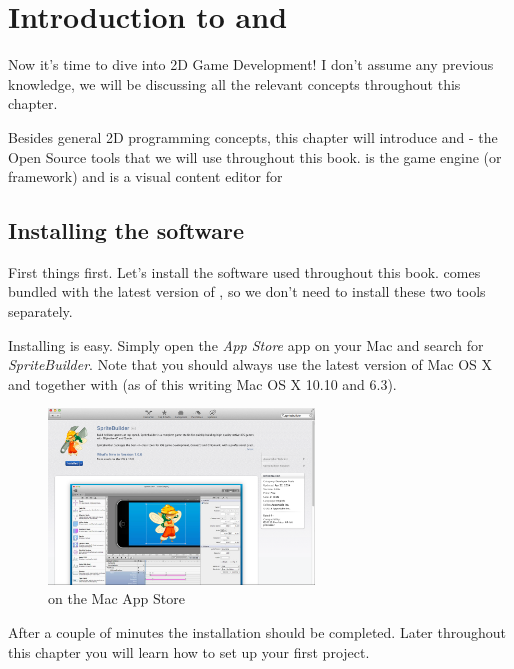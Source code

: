 \chapter{Introduction to \SB{} and \cocos{} }
Now it's time to dive into 2D Game Development! I don't assume any previous
knowledge, we will be discussing all the relevant concepts throughout this
chapter.

Besides general 2D programming concepts, this chapter will introduce \SB{}
and \cocos{} - the Open Source tools that we will use throughout this book. 
\cocos{} is the game engine (or framework) and \SB{} is a visual content editor
for \cocos{}

\section{Installing the software}
First things first. Let's install the software used throughout this book. \SB{}
comes bundled with the latest version of \cocos{}, so we don't need to install
these two tools separately.

Installing \SB{} is easy. Simply open the \textit{App Store} app on your Mac and
search for \textit{SpriteBuilder}. Note that you should always use the latest
version of Mac OS X and \xcode{} together with \SB{} (as of this writing Mac
OS X 10.10 and \xcode{} 6.3).

\begin{figure}[H] 
		\centering
		\includegraphics[width=200pt]{images/cocos2d/setup/mac_appstore_install.png}     
		\caption{\SB{} on the Mac App Store}
\end{figure}

After a couple of minutes the \SB{} installation should be completed. Later
throughout this chapter you will learn how to set up your first project.

